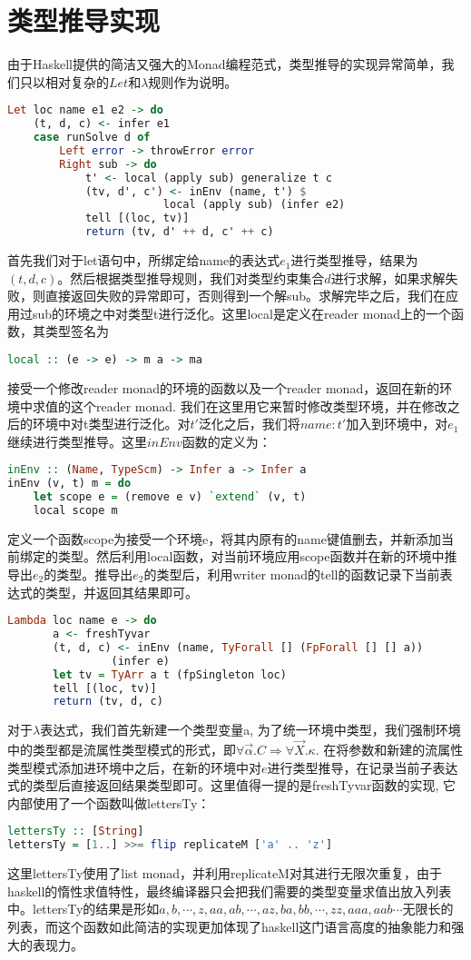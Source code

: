 \documentclass[UTF8, colorlinks]{pkuthss}
\begin{document}
	\section{类型推导实现}
	由于Haskell提供的简洁又强大的Monad编程范式，类型推导的实现异常简单，我们只以相对复杂的$Let$和$\lambda$规则作为说明。
	\begin{lstlisting}[language=haskell]
Let loc name e1 e2 -> do
    (t, d, c) <- infer e1
    case runSolve d of
        Left error -> throwError error
        Right sub -> do
            t' <- local (apply sub) generalize t c
            (tv, d', c') <- inEnv (name, t') $ 
            			local (apply sub) (infer e2)
            tell [(loc, tv)]
            return (tv, d' ++ d, c' ++ c)
	\end{lstlisting}
	首先我们对于let语句中，所绑定给name的表达式$e_1$进行类型推导，结果为$(t, d, c)$。然后根据类型推导规则，我们对类型约束集合$d$进行求解，如果求解失败，则直接返回失败的异常即可，否则得到一个解sub。求解完毕之后，我们在应用过sub的环境之中对类型t进行泛化。这里local是定义在reader monad上的一个函数，其类型签名为
	\begin{lstlisting}[language=haskell]
local :: (e -> e) -> m a -> ma
	\end{lstlisting}
	接受一个修改reader monad的环境的函数以及一个reader monad，返回在新的环境中求值的这个reader monad. 我们在这里用它来暂时修改类型环境，并在修改之后的环境中对t类型进行泛化。对$t'$泛化之后，我们将$name:t'$加入到环境中，对$e_1$继续进行类型推导。这里$inEnv$函数的定义为：
	\begin{lstlisting}[language=haskell]
inEnv :: (Name, TypeScm) -> Infer a -> Infer a
inEnv (v, t) m = do
    let scope e = (remove e v) `extend` (v, t) 
    local scope m
	\end{lstlisting}
	定义一个函数scope为接受一个环境e，将其内原有的name键值删去，并新添加当前绑定的类型。然后利用local函数，对当前环境应用scope函数并在新的环境中推导出$e_2$的类型。推导出$e_2$的类型后，利用writer monad的tell的函数记录下当前表达式的类型，并返回其结果即可。
	\begin{lstlisting}[language=haskell]
Lambda loc name e -> do 
       a <- freshTyvar
       (t, d, c) <- inEnv (name, TyForall [] (FpForall [] [] a)) 
       			(infer e)
       let tv = TyArr a t (fpSingleton loc)
       tell [(loc, tv)]
       return (tv, d, c)
	\end{lstlisting}
	对于$\lambda$表达式，我们首先新建一个类型变量a, 为了统一环境中类型，我们强制环境中的类型都是流属性类型模式的形式，即$\forall\vec{\alpha}.C\Rightarrow\forall\vec{X}.\kappa$. 在将参数和新建的流属性类型模式添加进环境中之后，在新的环境中对$e$进行类型推导，在记录当前子表达式的类型后直接返回结果类型即可。这里值得一提的是freshTyvar函数的实现, 它内部使用了一个函数叫做lettersTy：
	\begin{lstlisting}[language=haskell]
lettersTy :: [String]
lettersTy = [1..] >>= flip replicateM ['a' .. 'z']
	\end{lstlisting}
	这里lettersTy使用了list monad，并利用replicateM对其进行无限次重复，由于haskell的惰性求值特性，最终编译器只会把我们需要的类型变量求值出放入列表中。lettersTy的结果是形如${a, b, \cdots, z, aa, ab, \cdots, az, ba, bb, \cdots, zz, aaa, aab\cdots}$无限长的列表，而这个函数如此简洁的实现更加体现了haskell这门语言高度的抽象能力和强大的表现力。
\end{document}
